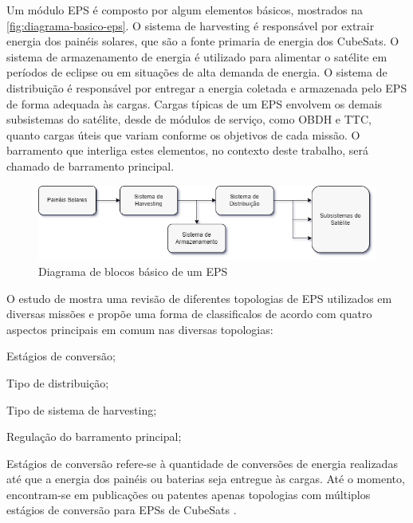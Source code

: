 Um módulo \gls{EPS} é composto por algum elementos básicos, mostrados na \autoref{fig:diagrama-basico-eps}.
O sistema de harvesting é responsável por extrair energia dos painéis solares, que são a fonte primaria de energia dos CubeSats.
O sistema de armazenamento de energia é utilizado para alimentar o satélite em períodos de eclipse ou em situações de alta demanda de energia.
O sistema de distribuição é responsável por entregar a energia coletada e armazenada pelo \gls{EPS} de forma adequada às cargas.
Cargas típicas de um \gls{EPS} envolvem os demais subsistemas do satélite, desde de módulos de serviço, como \gls{OBDH} e \gls{TTC}, quanto cargas úteis que variam conforme os objetivos de cada missão.
O barramento que interliga estes elementos, no contexto deste trabalho, será chamado de barramento principal.

\begin{figure}[htp]
    \caption{Diagrama de blocos básico de um \gls{EPS}}
    \begin{center}
        \includegraphics[width=\textwidth, keepaspectratio]{images/basic-eps-block-diagram.png}
    \end{center}
    \label{fig:diagrama-basico-eps}
\end{figure}


O estudo de \textcite{comprehensive-review-eps} mostra uma revisão de diferentes topologias de \gls{EPS} utilizados em diversas missões e propõe uma forma de classificalos de acordo com quatro aspectos principais em comum nas diversas topologias:
\begin{alineas}
    \item Estágios de conversão;
    \item Tipo de distribuição; %
    \item Tipo de sistema de harvesting;%
    \item Regulação do barramento principal;%
\end{alineas}

Estágios de conversão refere-se à quantidade de conversões de energia realizadas até que a energia dos painéis ou baterias seja entregue às cargas. Até o momento, encontram-se em publicações ou patentes apenas topologias com múltiplos estágios de conversão para \gls{EPS}s de CubeSats \cite{comprehensive-review-eps}.

